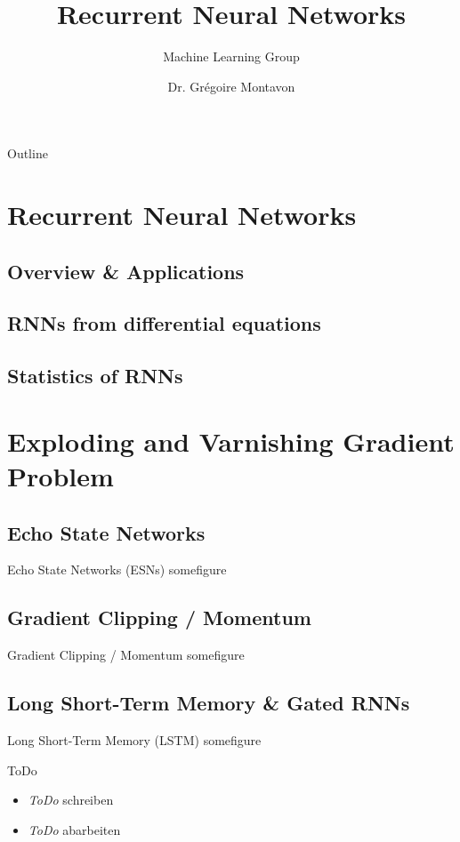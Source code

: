 \documentclass[Nike]{tuberlinbeamer}
\title{Recurrent Neural Networks}
\subtitle{Machine Learning Group}
\author[Deep Neural Networks]{Dr. Gr\'egoire Montavon}
\institute{Technische Universität Berlin}
\begin{document}
\begin{frame}
\maketitle
\end{frame}


\begin{frame}{Outline}
\tableofcontents
\end{frame}

\section{Recurrent Neural Networks}
\begin{frame}
	
\end{frame}


\subsection{Overview \& Applications}
\subsection{RNNs from differential equations}
\subsection{Statistics of RNNs}

\section{Exploding and Varnishing Gradient Problem}
\subsection{Echo State Networks}
\begin{frame}{Echo State Networks (ESNs)}
 somefigure 
\end{frame}

\subsection{Gradient Clipping / Momentum}
\begin{frame}{Gradient Clipping / Momentum}
 somefigure 
\end{frame}

\subsection{Long Short-Term Memory \& Gated RNNs}
\begin{frame}{Long Short-Term Memory (LSTM)}
 somefigure 
\end{frame}

\begin{frame}{ToDo}
\begin{itemize}
\item \emph{ToDo} schreiben
\item \emph{ToDo} abarbeiten
\end{itemize}
\end{frame}
\end{document}

